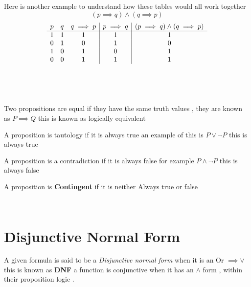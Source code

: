 \documentclass{article}
\theoremstyle{mytheoremstyle}
\theoremstyle{mytheoremstyle}
\theoremstyle{myproblemstyle}
\begin{document}
Here is another example to understand how these tables would all work together
\\
\[(p \implies q) \land (q \implies p)\]
\[\begin{array}{c c c | c | c}
		p & q & q \implies p & p \implies q & (p \implies q) \land (q \implies p) \\
		\hline
		1 & 1 & 1            & 1            & 1                                   \\
		0 & 1 & 0            & 1            & 0                                   \\
		1 & 0 & 1            & 0            & 1                                   \\
		0 & 0 & 1            & 1            & 1                                   \\
	\end{array}\] \\

\\ \\


\begin{definition}
	Two propositions are equal if they have the same truth values , they are known as $ P \implies Q$ this is known as logically equivalent
\end{definition}

\begin{definition}
	A proposition is tautology if it is always true an example of this is $ P \lor \neg P$ this is always true

\end{definition}

\begin{definition}
	A proposition is a contradiction if it is always false for example $ P \land \neg P $ this is always false
\end{definition}

\begin{definition}
	A proposition is \textbf{Contingent} if it is neither Always true or false
\end{definition}

\\
\section{Disjunctive Normal Form}
A given formula is said to be a \textit{Disjunctive normal form} when it is an Or $\implies \lor$ this is known as \textbf{DNF} a function is conjunctive when it has an $ \land $ form , within their proposition logic .
\end{document}
